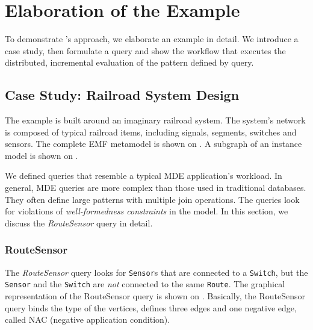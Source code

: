 \section{Elaboration of the Example}
\label{sec:elaboration}

To demonstrate \iqd{}'s approach, we elaborate an example in detail. We introduce a case study, then formulate a query and show the workflow that executes the distributed, incremental evaluation of the pattern defined by query.


\subsection{Case Study: Railroad System Design}
\label{railroad-system}


The example is built around an imaginary railroad system. The system's network is composed of typical railroad items, including signals, segments, switches and sensors. The complete EMF metamodel is shown on . A subgraph of an instance model is shown on .

We defined queries that resemble a typical MDE application's workload. In general, MDE queries are more complex than those used in traditional databases. They often define large patterns with multiple join operations. The queries look for violations of \emph{well-formedness constraints} in the model. In this section, we discuss the \textit{RouteSensor} query in detail.


\subsubsection{RouteSensor}


The \textit{RouteSensor} query looks for \texttt{Sensor}s that are connected to a \texttt{Switch}, but the \texttt{Sensor} and the \texttt{Switch} are \emph{not} connected to the same \texttt{Route}. The graphical representation of the RouteSensor query is shown on . Basically, the RouteSensor query binds the type of the vertices, defines three edges and one negative edge, called NAC (negative application condition). 


